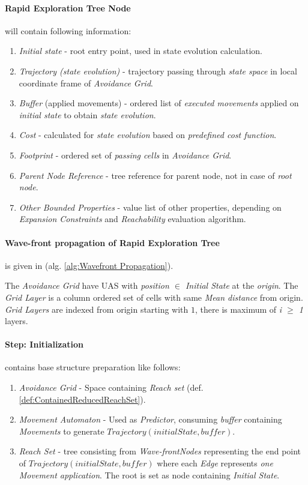 \paragraph{Rapid Exploration Tree Node} will contain following information:
\begin{enumerate}
    \item \emph{Initial state} - root entry point, used in state evolution calculation.
    \item \emph{Trajectory (state evolution)} - trajectory passing through \emph{state space} in local coordinate frame of \emph{Avoidance Grid}.
    \item \emph{Buffer} (applied movements) - ordered list of \emph{executed movements} applied on \emph{initial state} to obtain \emph{state evolution}.
    \item \emph{Cost} - calculated for \emph{state evolution} based on \emph{predefined cost function}. 
    \item \emph{Footprint} - ordered set of \emph{passing cells} in \emph{Avoidance Grid}.
    \item \emph{Parent Node Reference} - tree reference for parent node, not in case of \emph{root node}.
    \item \emph{Other Bounded Properties} - value list of other properties, depending on \emph{Expansion Constraints} and \emph{Reachability} evaluation algorithm.
\end{enumerate}

\paragraph{Wave-front propagation of Rapid Exploration Tree} is given in (alg. \ref{alg:Wavefront Propagation}). 

The \emph{Avoidance Grid} have UAS with \emph{position $\in$ Initial State} at the \emph{origin}. The \emph{Grid Layer} is a column ordered set of cells with same \emph{Mean distance} from origin. \emph{Grid Layers} are indexed from origin starting with $1$, there is maximum of \emph{i $\ge$ 1} layers.

\paragraph{Step: Initialization} contains base structure preparation like follows:
\begin{enumerate}
    \item \emph{Avoidance Grid} - Space containing \emph{Reach set} (def. \ref{def:ContainedReducedReachSet}).
    \item \emph{Movement Automaton} - Used as \emph{Predictor}, consuming \emph{buffer} containing \emph{Movements} to generate $Trajectory(initialState,buffer)$.
    
    \item \emph{Reach Set} -  tree consisting from \emph{Wave-frontNodes} representing the end point of $Trajectory(initialState,buffer)$ where each \emph{Edge} represents \emph{one Movement application}. The root is set as node containing \emph{Initial State}.
\end{enumerate}

